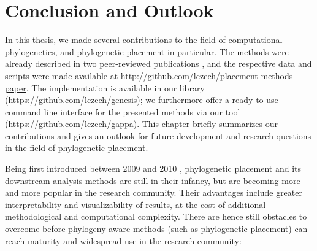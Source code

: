 
\chapter{Conclusion and Outlook}
\label{ch:ConclusionOutlook}

In this thesis, we made several contributions to the field of computational phylogenetics,
and phylogenetic placement in particular.
The methods were already described in two peer-reviewed publications \cite{Czech2018,Czech2018a},
and the respective data and scripts were made available at \url{http://github.com/lczech/placement-methods-paper}.
The implementation is available in our  library (\url{https://github.com/lczech/genesis});
we furthermore offer a ready-to-use command line interface for the presented methods
via our  tool (\url{https://github.com/lczech/gappa}).
This chapter briefly summarizes our contributions and gives an outlook for future development and research questions
in the field of phylogenetic placement.

Being first introduced between 2009 and 2010 \cite{Berger2009,Matsen2010a},
phylogenetic placement and its downstream analysis methods are still in their infancy,
but are becoming more and more popular in the research community.
Their advantages include greater interpretability and visualizability of results,
at the cost of additional methodological and computational complexity.
There are hence still obstacles to overcome before phylogeny-aware methods (such as phylogenetic placement)
can reach maturity and widespread use in the research community:

